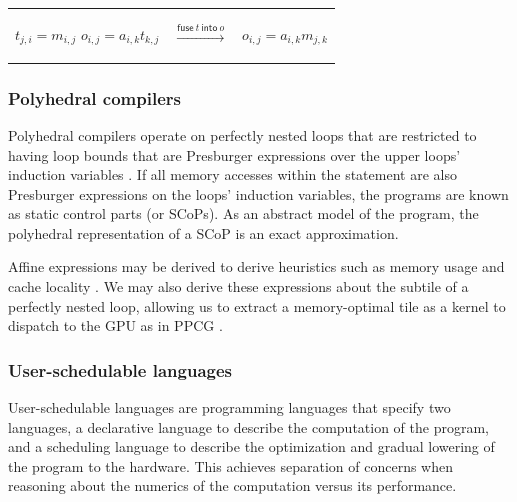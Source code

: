 \documentclass[review, acmsmall, nonacm]{acmart}
\begin{document}
\begin{tabular}{m{}m{}m{}} \\
  \begin{algorithmic}
    \ForAll {$(i, j) \in [0,64) \times [0,32)$}  
      \State $t_{j,i} = m_{i,j}$
    \EndFor
    \ForAll {$(i, j) \in [0,16) \times [0,64)$}  
      \For {$k \in [0,32)$}
        \State $o_{i,j} = a_{i,k} t_{k,j}$
      \EndFor
    \EndFor
  \end{algorithmic}
&
$\xrightarrow{\mathsf{fuse}~t~\mathsf{into}~o}$
&
\begin{algorithmic}
  \ForAll {$(i, j) \in [0,16) \times [0,64)$}  
    \For {$k \in [0,32)$}
      \State $o_{i,j} = a_{i,k} m_{j,k}$
    \EndFor
  \EndFor
\end{algorithmic}
\end{tabular}

\subsubsection{Polyhedral compilers}  Polyhedral compilers \cite{grosserPolyhedralASTGeneration2015,popGRAPHITEPolyhedralAnalyses2006,baghdadiTiramisuPolyhedralCompiler2019,bondhugula2008pluto} operate on perfectly nested loops that are restricted to having loop bounds that are Presburger expressions over the upper loops' induction variables \cite{feautrier1988parametric}. If all memory accesses within the statement are also Presburger expressions on the loops' induction variables, the programs are known as static control parts (or SCoPs). As an abstract model of the program, the polyhedral representation of a SCoP is an exact approximation.

Affine expressions may be derived to derive heuristics such as memory usage \cite{quillere2000optimizing} and cache locality \cite{pitchanathanFalconScalableAnalytical2024, zinenko2017unified}. We may also derive these expressions about the subtile of a perfectly nested loop, allowing us to extract a memory-optimal tile as a kernel to dispatch to the GPU as in PPCG \cite{verdoolaegePolyhedralParallelCode2013}.

\subsubsection{User-schedulable languages} User-schedulable languages \cite{visserStrategoLanguageProgram2001, ragan-kelleyHalideDecouplingAlgorithms2017,chenTVMAutomatedEndtoEnd2018, ikarashiExo2Growing2025} are programming languages that specify two languages, a declarative language to describe the computation of the program, and a scheduling language to describe the optimization and gradual lowering of the program to the hardware. This achieves separation of concerns when reasoning about the numerics of the computation versus its performance.
\end{document}

